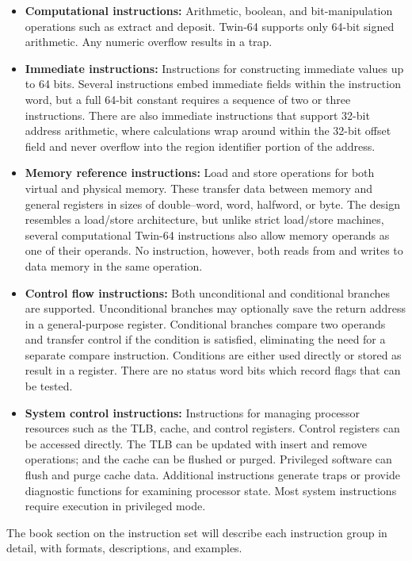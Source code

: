 \begin{itemize}
\setlength{\itemsep}{0.5em}
\setlength{\parskip}{0pt}
  \item \textbf{Computational instructions:} Arithmetic, boolean, and bit-manipulation operations such as extract and deposit. Twin-64 supports only 64-bit signed arithmetic. Any numeric overflow results in a trap.
 
  \item \textbf{Immediate instructions:} Instructions for constructing immediate values up to 64 bits. Several instructions embed immediate fields within the instruction word, but a full 64-bit constant requires a sequence of two or three instructions. There are also immediate instructions that support 32-bit address arithmetic, where calculations wrap around within the 32-bit offset field and never overflow into the region identifier portion of the address.
 
  \item \textbf{Memory reference instructions:} Load and store operations for both virtual and physical memory. These transfer data between memory and general registers in sizes of double--word, word, halfword, or byte. The design resembles a load/store architecture, but unlike strict load/store machines, several computational Twin-64 instructions also allow memory operands as one of their operands. No instruction, however, both reads from and writes to data memory in the same operation.
  
  \item \textbf{Control flow instructions:} Both unconditional and conditional branches are supported. Unconditional branches may optionally save the return address in a general-purpose register. Conditional branches compare two operands and transfer control if the condition is satisfied, eliminating the need for a separate compare instruction. Conditions  are either used directly or stored as result in a register. There are no status word bits which record flags that can be tested.
    
  \item \textbf{System control instructions:} Instructions for managing processor resources such as the TLB, cache, and control registers. Control registers can be accessed directly. The TLB can be updated with insert and remove operations; and the cache can be flushed or purged. Privileged software can flush and purge cache data. Additional instructions generate traps or provide diagnostic functions for examining processor state. Most system instructions require execution in privileged mode.
\end{itemize}

The book section on the instruction set will describe each instruction group in detail, with formats, descriptions, and examples.
